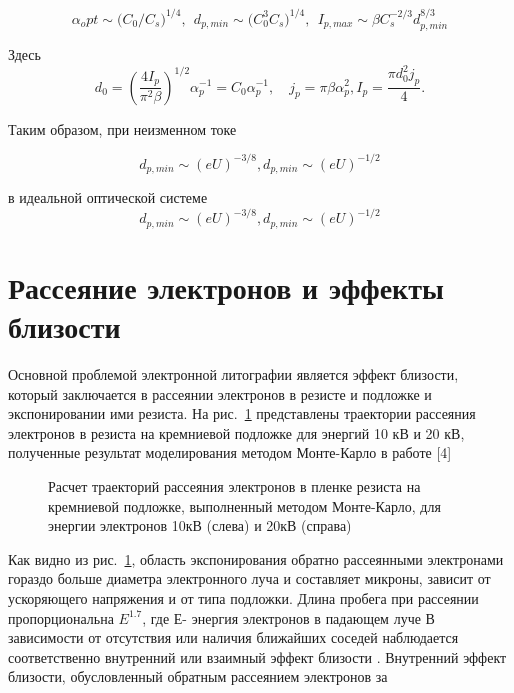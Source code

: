 \begin{equation}
\alpha_opt\sim{(}C_0/C_s{)}^{1/4},\>\>d_{p,min}\sim{(}C_0^3 C_s{)}^{1/4},\>\> I_{p,max}\sim \beta C_s^{-2/3} d_{p,min}^{8/3}\label{eq:A6}
\end{equation}

Здесь
\[
    d_0= \left(\frac{4I_p}{\pi^2 \beta}\right)^{1/2} \alpha_p^{-1}=C_0\alpha_p^{-1},
    \quad j_p=\pi \beta \alpha_p^2 , I_p= \frac{\pi d_0^2 j_p}{4}.
\]

Таким образом, при неизменном токе

\begin{equation}
d_{p,min}\sim (eU)^{-3/8},d_{p,min}\sim(eU)^{-1/2}
\label{eq:A7}
\end{equation}

в идеальной оптической системе
\begin{equation}
d_{p,min}\sim (eU)^{-3/8},d_{p,min}\sim(eU)^{-1/2}
\end{equation}

\section{Рассеяние электронов и эффекты близости}

Основной проблемой электронной литографии является эффект близости, который заключается в рассеянии электронов в резисте и подложке и экспонировании ими резиста. На рис.~\ref{fig:4} представлены траектории рассеяния электронов в резиста на кремниевой подложке для энергий 10 кВ и 20 кВ, полученные результат моделирования методом Монте-Карло в работе [4]

\begin{figure}[H]
\center
\caption{ Расчет траекторий рассеяния электронов в пленке резиста на кремниевой подложке, выполненный методом Монте-Карло, для энергии электронов 10кВ (слева) и 20кВ (справа)}
\label{fig:4}
\end{figure}

Как видно из рис.~\ref{fig:4}, область экспонирования обратно рассеянными электронами гораздо больше диаметра электронного луча и составляет микроны, зависит от ускоряющего напряжения и от типа подложки. Длина пробега при рассеянии пропорциональна $E^{1.7}$, где Е- энергия электронов в падающем луче
В зависимости от отсутствия или наличия ближайших соседей наблюдается соответственно внутренний или взаимный эффект близости . Внутренний эффект близости, обусловленный обратным рассеянием электронов за

